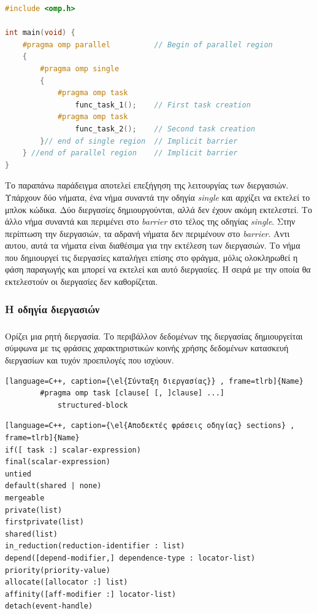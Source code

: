 \documentclass[12pt]{article}
\newcommand{\en}[1]{\foreignlanguage{english}{#1}}
\newcommand{\el}[1]{\selectlanguage{greek}{#1}\selectlanguage{english}}
\begin{document}
		\begin{lstlisting}[tabsize=4, basicstyle=\small, language=C++, caption={\el{Παράδειγμα κώδικα με διεργασίες}}, frame=tb]
#include <omp.h>

int main(void) {	
	#pragma omp parallel          // Begin of parallel region
	{
		#pragma omp single
		{
			#pragma omp task
				func_task_1();    // First task creation
			#pragma omp task
				func_task_2();    // Second task creation
		}// end of single region  // Implicit barrier
	} //end of parallel region    // Implicit barrier
}
\end{lstlisting}
\clearpage
Το παραπάνω παράδειγμα αποτελεί επεξήγηση της λειτουργίας των διεργασιών. Υπάρχουν δύο νήματα, ένα νήμα συναντά την οδηγία \emph{\en{single}} και αρχίζει να εκτελεί το μπλοκ κώδικα. Δύο διεργασίες δημιουργούνται, αλλά δεν έχουν ακόμη εκτελεστεί. Tο άλλο νήμα συναντά και περιμένει στο  \emph{\en{barrier}} στο τέλος της οδηγίας \emph{\en{single}}. Στην περίπτωση την διεργασιών, τα αδρανή νήματα δεν περιμένουν στο \emph{\en{barrier}}. Αντι αυτου, αυτά τα νήματα είναι διαθέσιμα για την εκτέλεση των διεργασιών. Το νήμα που δημιουργεί τις διεργασίες καταλήγει επίσης στο φράγμα, μόλις ολοκληρωθεί η φάση παραγωγής και μπορεί να εκτελεί και αυτό διεργασίες. Η σειρά με την οποία θα εκτελεστούν οι διεργασίες δεν καθορίζεται.

\subsubsection{Η οδηγία διεργασιών}
\subparagraph{}
	Ορίζει μια ρητή διεργασία. Το περιβάλλον δεδομένων της διεργασίας δημιουργείται σύμφωνα με τις φράσεις χαρακτηριστικών κοινής χρήσης δεδομένων κατασκευή διεργασίων και τυχόν προεπιλογές που ισχύουν\cite{thenextstep20}.
	
\begin{lstlisting}[language=C++, caption={\el{Σύνταξη διεργασίας}} , frame=tlrb]{Name}
		#pragma omp task [clause[ [, ]clause] ...] 
			structured-block 
\end{lstlisting}

\begin{lstlisting}[language=C++, caption={\el{Αποδεκτές φράσεις οδηγίας} sections} , frame=tlrb]{Name}
if([ task :] scalar-expression) 
final(scalar-expression) 
untied 
default(shared | none) 
mergeable 
private(list) 
firstprivate(list) 
shared(list) 
in_reduction(reduction-identifier : list) 
depend([depend-modifier,] dependence-type : locator-list) 
priority(priority-value) 
allocate([allocator :] list) 
affinity([aff-modifier :] locator-list) 
detach(event-handle)
\end{lstlisting}
\end{document}
